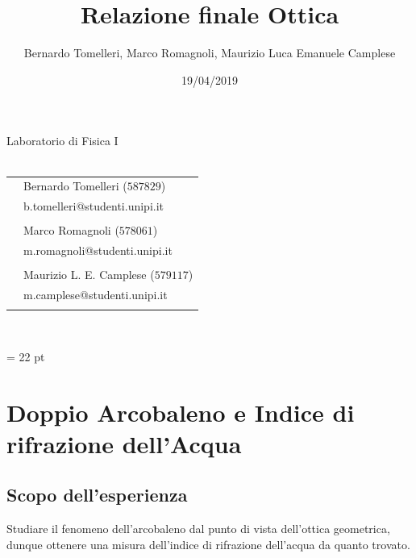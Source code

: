 \documentclass{report}[a4paper,11pt]
\title{Relazione finale Ottica}
\author{Bernardo Tomelleri, Marco Romagnoli, Maurizio Luca Emanuele Camplese}
\date{19/04/2019}
\begin{document}
\begin{titlepage}
	\begin{center}
		{\huge{Laboratorio di Fisica I}}\\\vspace*{7mm}
		{\huge{\textbf{\thetitle}}}\\\vspace*{15mm}
		\begin{tabular}{ll}
		& Bernardo Tomelleri ($587829$) \\
		& b.tomelleri@studenti.unipi.it\\ \\
		& Marco Romagnoli ($578061$) \\
		& m.romagnoli@studenti.unipi.it \\ \\
		& Maurizio L. E. Camplese ($579117$) \\
		& m.camplese@studenti.unipi.it \\ \\
		\end{tabular}\\\vspace*{5mm}
		{\thedate}
	\end{center}
\end{titlepage}
\makeatother
\restoregeometry
\tableofcontents
\emergencystretch = 22 pt
\renewcommand{\chaptermark}[1]{\markboth{\arabic{chapter}.\ #1}{}}

\chapter{Doppio Arcobaleno e Indice di rifrazione dell'Acqua}
\section{Scopo dell'esperienza}
Studiare il fenomeno dell'arcobaleno dal punto di vista dell'ottica geometrica, dunque ottenere una misura dell'indice di rifrazione dell'acqua da quanto trovato.
\end{document}
